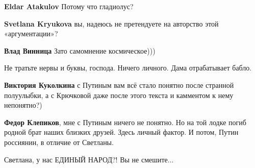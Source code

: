 \begin{itemize}
\begin{itemize}
\textbf{Eldar Atakulov} Потому что гладиолус?

 
\textbf{Svetlana Kryukova} вы, надеюсь не претендуете на авторство этой «аргументации»? \Smiley[1.0][yellow]

 
\textbf{Влад Винница} Зато самомнение космическое)))

 
Не тратьте нервы и буквы, господа. Ничего личного. Дама отрабатывает бабло.

 
\textbf{Виктория Куколкина} с Путиным вам всё стало понятно после странной полуулыбки, а с Крючковой даже после этого текста и камментом к нему непонятно?)

 
\textbf{Федор Клепиков}, мне с Путиным ничего не понятно. Но на той лодке погиб родной брат наших близких друзей. Здесь личный фактор. И потом, Путин россиянин, в отличие от Светланы.

 

Светлана, у нас ЕДИНЫЙ НАРОД?! Вы не смешите...


\end{itemize}
\end{itemize}
